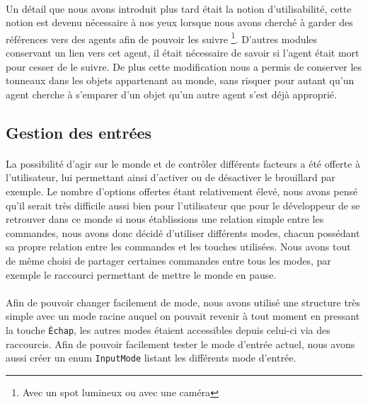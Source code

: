 \paragraph{}
Un détail que nous avons introduit plus tard était la notion d'utilisabilité,
cette notion est devenu nécessaire à nos yeux lorsque nous avons cherché à
garder des références vers des agents afin de pouvoir les suivre
\footnote{Avec un spot lumineux ou avec une caméra}. D'autres modules
conservant un lien vers cet agent, il était nécessaire de savoir si l'agent
était mort pour cesser de le suivre. De plus cette modification nous a permis
de conserver les tonneaux dans les objets appartenant au monde, sans risquer
pour autant qu'un agent cherche à s'emparer d'un objet qu'un autre agent s'est
déjà approprié.

\subsection{Gestion des entrées}
\paragraph{}
La possibilité d'agir sur le monde et de contrôler différents facteurs a été
offerte à l'utilisateur, lui permettant ainsi d'activer ou de désactiver le
brouillard par exemple. Le nombre d'options offertes étant relativement
élevé, nous avons pensé qu'il serait très difficile aussi bien pour
l'utilisateur que pour le développeur de se retrouver dans ce monde si nous
établissions une relation simple entre les commandes, nous avons donc décidé
d'utiliser différents modes, chacun possédant sa propre relation entre les
commandes et les touches utilisées. Nous avons tout de même choisi de partager
certaines commandes entre tous les modes, par exemple le raccourci permettant
de mettre le monde en pause.

\paragraph{}
Afin de pouvoir changer facilement de mode, nous avons utilisé une structure
très simple avec un mode racine auquel on pouvait revenir à tout moment en
pressant la touche \verb!Échap!, les autres modes étaient accessibles depuis
celui-ci via des raccourcis. Afin de pouvoir facilement tester le mode
d'entrée actuel, nous avons aussi créer un enum \verb!InputMode! listant les
différents mode d'entrée.

